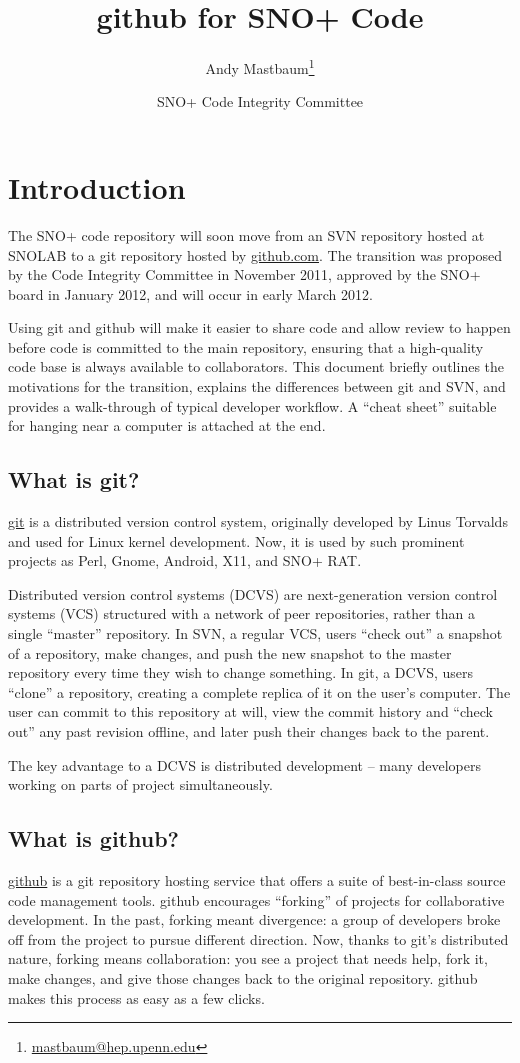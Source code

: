 \documentclass{article}
\title{github for SNO+ Code}
\author{Andy Mastbaum\footnote{\href{mailto:mastbaum@hep.upenn.edu}{mastbaum@hep.upenn.edu}}}
\date{SNO+ Code Integrity Committee}
\begin{document}
\maketitle
\tableofcontents
\section{Introduction}
The SNO+ code repository will soon move from an SVN repository hosted at SNOLAB to a git repository hosted by \href{http://github.com}{github.com}. The transition was proposed by the Code Integrity Committee in November 2011, approved by the SNO+ board in January 2012, and will occur in early March 2012.

Using git and github will make it easier to share code and allow review to happen before code is committed to the main repository, ensuring that a high-quality code base is always available to collaborators. This document briefly outlines the motivations for the transition, explains the differences between git and SVN, and provides a walk-through of typical developer workflow. A ``cheat sheet'' suitable for hanging near a computer is attached at the end.
\subsection{What is git?}
\href{http://git-scm.com}{git} is a distributed version control system, originally developed by Linus Torvalds and used for Linux kernel development. Now, it is used by such prominent projects as Perl, Gnome, Android, X11, and SNO+ RAT.

Distributed version control systems (DCVS) are next-generation version control systems (VCS) structured with a network of peer repositories, rather than a single ``master'' repository. In SVN, a regular VCS, users ``check out'' a snapshot of a repository, make changes, and push the new snapshot to the master repository every time they wish to change something. In git, a DCVS, users ``clone'' a repository, creating a complete replica of it on the user's computer. The user can commit to this repository at will, view the commit history and ``check out'' any past revision offline, and later push their changes back to the parent.

The key advantage to a DCVS is distributed development -- many developers working on parts of project simultaneously.
\subsection{What is github?}
\href{http://www.github.com}{github} is a git repository hosting service that offers a suite of best-in-class source code management tools. github encourages ``forking'' of projects for collaborative development. In the past, forking meant divergence: a group of developers broke off from the project to pursue different direction. Now, thanks to git's distributed nature, forking means collaboration: you see a project that needs help, fork it, make changes, and give those changes back to the original repository. github makes this process as easy as a few clicks.
\end{document}
